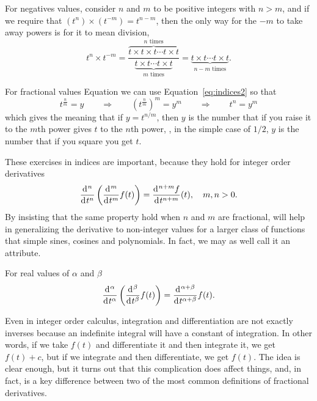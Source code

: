 For negatives values, consider $n$ and $m$ to be positive integers with $n > m$, and if we require that $\left( t^n \right) \times \left( t^{-m} \right) = t^{n-m}$, then the only way for the $-m$ to take away powers is for it to mean division, 
\begin{equation}
  t^n \times t^{-m} = \frac{\overbrace{t \times t \times t \cdots t \times t}^{\mbox{$n$ times}}}{\underbrace{t \times t \cdots t \times t}_{\mbox{$m$ times}}} = \underbrace{t \times t  \cdots t \times t}_{\mbox{$n-m$ times}}.
  \label{eq:indices3}
\end{equation}

For fractional values Equation we can use Equation~\ref{eq:indices2} so that
\begin{equation}
  t^\frac{n}{m} = y \qquad \Longrightarrow \qquad \left( t^\frac{n}{m} \right)^m = y^m \qquad \Longrightarrow \qquad t^n = y^m
\end{equation}
which gives the meaning that if $y = t^{n/m}$, then $y$ is the number that if you raise it to the $m$th power gives $t$ to the $n$th power, \eg, in the simple case of $1/2$, $y$ is the number that if you square you get $t$.

These exercises in indices are important, because they hold for integer order derivatives
\begin{equation}
  \label{eq:derivindex}
  \frac{\operatorname{d}\hspace*{-1pt}^n}{\operatorname{d}\hspace*{-1pt} t^n} \left( \frac{\operatorname{d}\hspace*{-1pt}^m}{\operatorname{d}\hspace*{-1pt} t^m} f(t) \right) = \frac{\operatorname{d}\hspace*{-1pt}^{n+m} f}{\operatorname{d}\hspace*{-1pt} t^{n+m}}(t), \quad m,n > 0.
\end{equation}
By insisting that the same property hold when $n$ and $m$ are fractional, will help in generalizing the derivative to non-integer values for a larger class of functions that simple sines, cosines and polynomials. In fact, we may as well call it an attribute. 

\begin{attribute}
  For real values of $\alpha$ and $\beta$
  \begin{equation}
    \frac{\operatorname{d}\hspace*{-1pt}^\alpha}{\operatorname{d}\hspace*{-1pt} t^\alpha} \left( \frac{\operatorname{d}\hspace*{-1pt}^\beta}{\operatorname{d}\hspace*{-1pt} t^\beta} f(t) \right) = \frac{\operatorname{d}\hspace*{-1pt}^{\alpha + \beta}}{\operatorname{d}\hspace*{-1pt} t^{\alpha + \beta}}f(t).
    \label{eq:derivindices}
  \end{equation}
\end{attribute}

Even in integer order calculus, integration and differentiation are not exactly inverses because an indefinite integral will have a constant of integration. In other words, if we take $f(t)$ and differentiate it and then integrate it, we get $f(t) + c$, but if we integrate and then differentiate, we get $f(t)$. The idea is clear enough, but it turns out that this complication does affect things, and, in fact, is a key difference between two of the most common definitions of fractional derivatives. 


